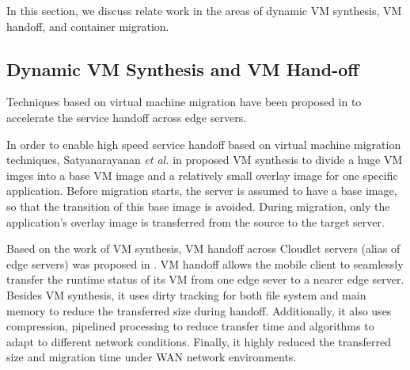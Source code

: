 In this section, we discuss relate work in the areas of dynamic VM synthesis, VM handoff, and container migration.

\subsection{Dynamic VM Synthesis and VM Hand-off} \label{motivation:vmhandoff}

Techniques based on virtual machine migration have been proposed in  \cite{ha2015vmhandoff} \cite{satya2009case} to accelerate the service handoff across edge servers. 

In order to enable high speed service handoff based on virtual machine migration techniques, Satyanarayanan \textit{et al.} in \cite{satya2009case} proposed VM synthesis to divide a huge VM imges into a base VM image and a relatively small overlay image for one specific application. Before migration starts, the server is assumed to have a base image, so that the transition of this base image is avoided. During migration, only the application's overlay image is transferred from the source to the target server.

Based on the work of VM synthesis, VM handoff across Cloudlet servers (alias of edge servers) was proposed in \cite{ha2015vmhandoff}. VM handoff allows the mobile client to seamlessly transfer the runtime status of its VM from one edge sever to a nearer edge server. Besides VM synthesis, it uses dirty tracking for both file system and main memory  to reduce the transferred size during handoff.
Additionally, it also uses compression, pipelined processing to reduce transfer time and algorithms to adapt to different network conditions.
Finally, it highly reduced the transferred size and migration time under WAN network environments.

